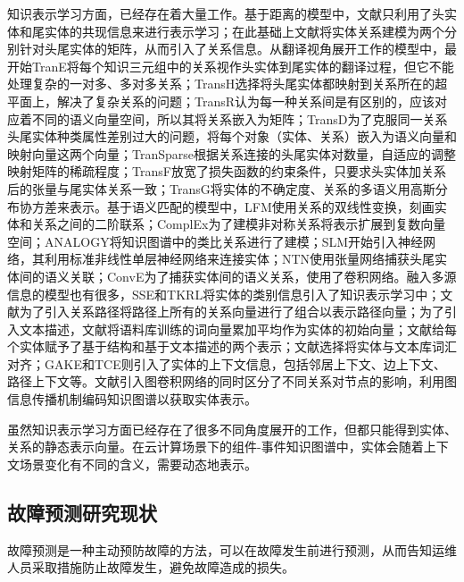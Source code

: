 知识表示学习方面，已经存在着大量工作。基于距离的模型中，文献\parencite{bordes2012joint}只利用了头实体和尾实体的共现信息来进行表示学习；在此基础上文献\parencite{bordes2011learning}将实体关系建模为两个分别针对头尾实体的矩阵，从而引入了关系信息。从翻译视角展开工作的模型中，最开始TranE\cite{bordes2013translatingE}将每个知识三元组中的关系视作头实体到尾实体的翻译过程，但它不能处理复杂的一对多、多对多关系；TransH\cite{wang2014knowledge}选择将头尾实体都映射到关系所在的超平面上，解决了复杂关系的问题；TransR\cite{lin2015learning}认为每一种关系间是有区别的，应该对应着不同的语义向量空间，所以其将关系嵌入为矩阵；TransD\cite{ji2015knowledge}为了克服同一关系头尾实体种类属性差别过大的问题，将每个对象（实体、关系）嵌入为语义向量和映射向量这两个向量；TranSparse\cite{ji2016knowledge}根据关系连接的头尾实体对数量，自适应的调整映射矩阵的稀疏程度；TransF\cite{feng2016knowledge}放宽了损失函数的约束条件，只要求头实体加关系后的张量与尾实体关系一致；TransG\cite{ou2016asymmetric}将实体的不确定度、关系的多语义用高斯分布协方差来表示。基于语义匹配的模型中，LFM\cite{jenatton2012latent}使用关系的双线性变换，刻画实体和关系之间的二阶联系；ComplEx\cite{trouillon2016complex}为了建模非对称关系将表示扩展到复数向量空间；ANALOGY\cite{liu2017analogical}将知识图谱中的类比关系进行了建模；SLM\cite{socher2013reasoning}开始引入神经网络，其利用标准非线性单层神经网络来连接实体；NTN\cite{socher2013reasoning}使用张量网络捕获头尾实体间的语义关联；ConvE\cite{dettmers2018convolutional}为了捕获实体间的语义关系，使用了卷积网络。融入多源信息的模型也有很多，SSE\cite{guo2015semantically}和TKRL\cite{xie2016representation}将实体的类别信息引入了知识表示学习中；文献\parencite{lin2015modeling}为了引入关系路径将路径上所有的关系向量进行了组合以表示路径向量；为了引入文本描述，文献\parencite{socher2013reasoning}将语料库训练的词向量累加平均作为实体的初始向量；文献\parencite{xie2016representation}给每个实体赋予了基于结构和基于文本描述的两个表示；文献\parencite{wang2016text}选择将实体与文本库词汇对齐；GAKE\cite{feng2016gake}和TCE\cite{shi2017knowledge}则引入了实体的上下文信息，包括邻居上下文、边上下文、路径上下文等。文献\parencite{schlichtkrull2018modeling}引入图卷积网络的同时区分了不同关系对节点的影响，利用图信息传播机制编码知识图谱以获取实体表示。

虽然知识表示学习方面已经存在了很多不同角度展开的工作，但都只能得到实体、关系的静态表示向量。在云计算场景下的组件-事件知识图谱中，实体会随着上下文场景变化有不同的含义，需要动态地表示。
\subsection{故障预测研究现状}
故障预测是一种主动预防故障的方法，可以在故障发生前进行预测，从而告知运维人员采取措施防止故障发生，避免故障造成的损失。

